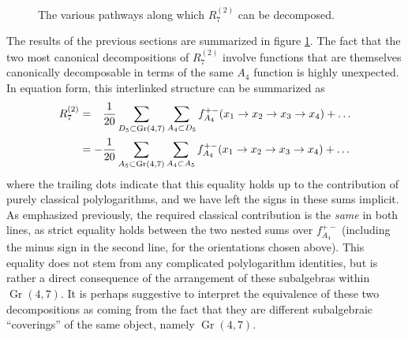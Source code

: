 \documentclass[12pt]{article}
\DeclareMathOperator{\Gr}{Gr}
\begin{document}
\begin{figure}[t] \centering
  \caption{The various pathways along which $R^{(2)}_7$ can be decomposed.}
\label{fig:R27_decompositions}
\end{figure}

The results of the previous sections are summarized in figure \ref{fig:R27_decompositions}. The fact that the two most canonical decompositions of $R^{(2)}_7$ involve functions that are themselves canonically decomposable in terms of the same $A_4$ function is highly unexpected. In equation form, this interlinked structure can be summarized as
\begin{align}
	R^{(2)}_7 &=  {\color{white} - } \frac{1}{20} \sum_{D_5\subset \Gr(4,7)} \sum_{A_4\subset D_5} f_{A_4}^{+-}(x_1\to x_2 \to x_3 \to x_4) + \dots \label{eq:r27_a4_d5_e6_decomposition} \\
	& = - \frac{1}{20}  \sum_{A_5\subset \Gr(4,7)} \sum_{A_4\subset A_5} f_{A_4}^{+-}(x_1\to x_2 \to x_3 \to x_4) + \dots \label{eq:r27_a4_a5_e6_decomposition}
\end{align}
where the trailing dots indicate that this equality holds up to the contribution of purely classical polylogarithms, and we have left the signs in these sums implicit. As emphasized previously, the required classical contribution is the \emph{same} in both lines, as strict equality holds between the two nested sums over $f_{A_4}^{+-}$ (including the minus sign in the second line, for the orientations chosen above). This equality does not stem from any complicated polylogarithm identities, but is rather a direct consequence of the arrangement of these subalgebras within $\Gr(4,7)$. It is perhaps suggestive to interpret the equivalence of these two decompositions as coming from the fact that they are different subalgebraic ``coverings'' of the same object, namely $\Gr(4,7)$.
\end{document}
